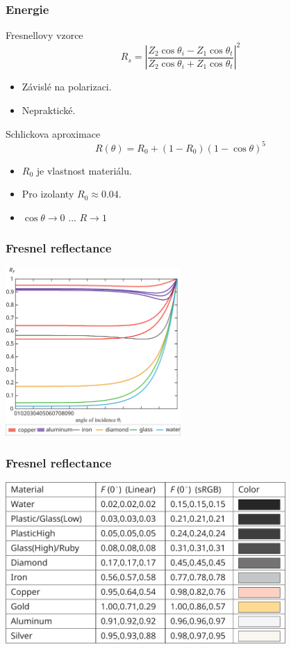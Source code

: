 \begin{frame}
    \frametitle{Energie}
    Fresnellovy vzorce
    \begin{equation*}
        R_s = \left| \frac{Z_2 \cos \theta_i - Z_1 \cos \theta_t}{Z_2 \cos \theta_i + Z_1 \cos \theta_t} \right|^2
    \end{equation*}
    \begin{itemize}
        \item Závislé na polarizaci.
        \item Nepraktické.
    \end{itemize}
    \pause\vfill
    Schlickova aproximace
    \begin{equation*}
        R(\theta) = R_0 + (1-R_0)(1-\cos\theta)^5
    \end{equation*}
    \begin{itemize}
        \item $R_0$ je vlastnost materiálu.
        \item Pro izolanty $R_0 \approx 0.04$.
        \item $\cos\theta \rightarrow 0$ ... $R \rightarrow 1$
    \end{itemize}
\end{frame}

\begin{frame}
    \frametitle{Fresnel reflectance}
    \includegraphics[width=0.5\textwidth]{pics/physicallyBasedRendering/fresnel_reflectance}
\end{frame}

\begin{frame}
    \frametitle{Fresnel reflectance}
    \includegraphics[width=0.8\textwidth]{pics/physicallyBasedRendering/fresnel_reflectance_table}
\end{frame}


